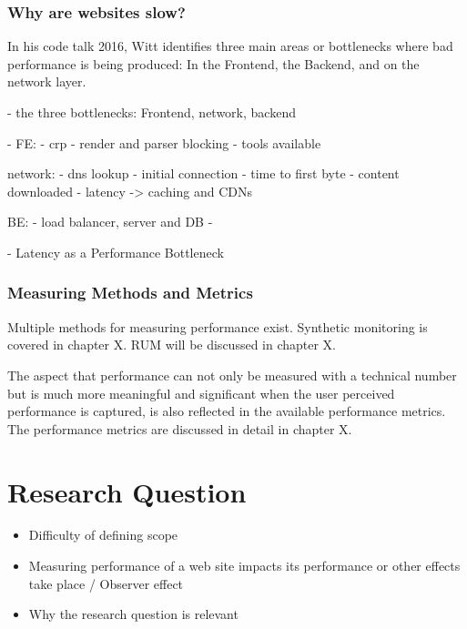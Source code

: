 \subsubsection{Why are websites slow?}

In his code talk 2016, Witt identifies three main areas or bottlenecks where bad performance is being produced: In the Frontend, the Backend, and on the network layer. 

- the three bottlenecks: Frontend, network, backend

- FE:
- crp
- render and parser blocking
- tools available

network:
- dns lookup
- initial connection
- time to first byte
- content downloaded
- latency
-> caching and CDNs

BE:
- load balancer, server and DB
- 


- Latency as a Performance Bottleneck




\subsubsection{Measuring Methods and Metrics}


Multiple methods for measuring performance exist.
Synthetic monitoring is covered in chapter X.
RUM will be discussed in chapter X.

The aspect that performance can not only be measured with a technical number but is much more meaningful and significant when the user perceived performance is captured, is also reflected in the available performance metrics.
The performance metrics are discussed in detail in chapter X.








\section{Research Question}

\begin{itemize}
\item Difficulty of defining scope
\item Measuring performance of a web site impacts its performance or other effects take place / Observer effect
\item Why the research question is relevant
\end{itemize}

